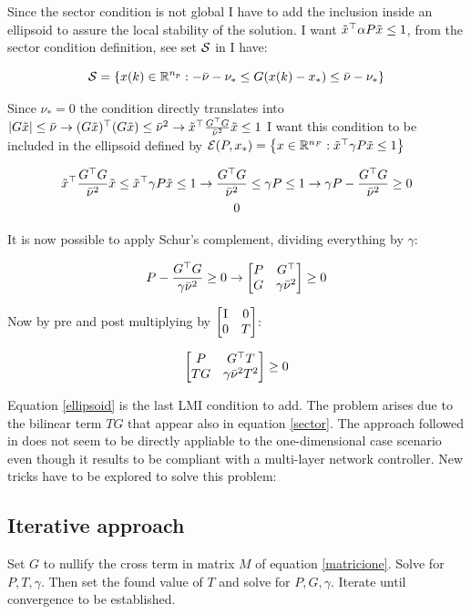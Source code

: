 \documentclass{article}
\begin{document}
Since the sector condition is not global I have to add the inclusion inside an ellipsoid to assure the local stability of the solution. I want $\tilde{x}^\top \alpha P \tilde{x} \leq 1$, from the sector condition definition, see set ${\mathcal{S}}$ in \cite{css-extended} I have:

$$
  {\mathcal{S}} = \left\{ x(k) \in {\mathbb{R}}^{n_{p}} : -\bar{\nu} - \nu_* \leq G (x(k) - x_*) \leq \bar{\nu} - \nu_* \right\}
$$

Since $\nu_* = 0$ the condition directly translates into $|G \tilde{x}| \leq \bar{\nu} \to (G \tilde{x})^\top (G \tilde{x}) \leq \bar{\nu}^2 \to \tilde{x}^\top \frac{G^\top G}{\bar{\nu}^{2}} \tilde{x} \leq 1$ I want this condition to be included in the ellipsoid defined by ${\mathcal{E}}(P, x_*) = \left\{ x \in {\mathbb{R}}^{n_{F}}: \tilde{x}^\top \gamma P \tilde{x} \leq 1 \right\}$

\begin{multline*}
  \tilde{x}^\top \frac{G^\top G}{\bar{\nu}^{2}} \tilde{x} \leq \tilde{x}^\top \gamma P \tilde{x} \leq 1 \to \frac{G^\top G}{\bar{\nu}^{2}} \leq \gamma P \leq 1 \to \gamma P - \frac{G^\top G}{\bar{\nu}^{2}} \geq 0\\
  0
\end{multline*}

It is now possible to apply Schur's complement, dividing everything by $\gamma$:

\begin{equation}
  P - \frac{G^\top G}{\gamma \bar{\nu}^{2}} \geq 0 \to \left[\begin{matrix}P & G^\top\\ G & \gamma \bar{\nu}^{2}\end{matrix}\right] \geq 0
\end{equation}

Now by pre and post multiplying by $\left[\begin{matrix}\operatorname{I} & 0\\ 0 & T\end{matrix}\right]$:

\begin{equation}\label{ellipsoid}
  \left[\begin{matrix}P & G^\top T\\
  TG & \gamma \bar{\nu}^{2} T^{2}\end{matrix}\right] \geq 0
\end{equation}

Equation \ref{ellipsoid} is the last LMI condition to add. The problem arises due to the bilinear term $TG$ that appear also in equation \ref{sector}. The approach followed in \cite{css-extended} does not seem to be directly appliable to the one-dimensional case scenario even though it results to be compliant with a multi-layer network controller. New tricks have to be explored to solve this problem:

\subsection*{Iterative approach}
Set $G$ to nullify the cross term in matrix $M$ of equation \ref{matricione}. Solve for $P, T, \gamma$. Then set the found value of $T$ and solve for $P, G, \gamma$. Iterate until convergence to be established.
\end{document}
